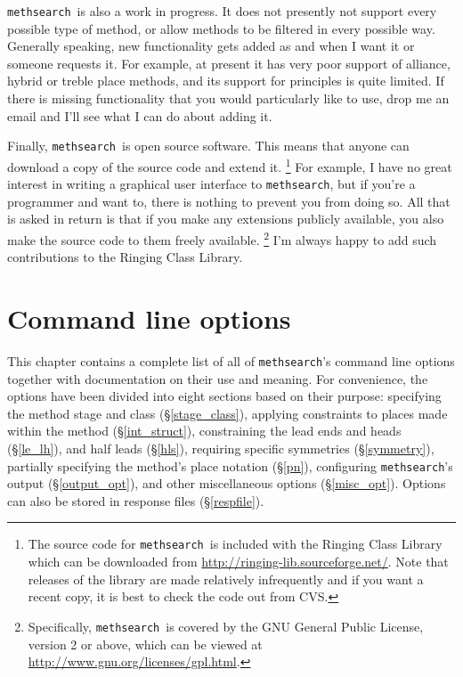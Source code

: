 \documentclass[a4paper,11pt,oneside]{book}
\def\methsearch{\texttt{meth\-search}}
\newcommand{\sref}[1]{\hyperref[#1]{\S\ref{#1}}}
\begin{document}
\methsearch\ is also a work in progress.  
It does not presently not support every possible type of method, 
or allow methods to be filtered in every possible way.
Generally speaking, new functionality gets added as and when I want it
or someone requests it.  For example, at present it has very poor support 
of alliance, hybrid or treble place methods,%
and its support for principles
is quite limited.
If there is missing functionality that you would particularly like to use, 
drop me an email and I'll see what I can do about adding it.

Finally, \methsearch\ is open source software.
This means that anyone 
can download a copy of the source code and extend it.%
\footnote{The source code for \methsearch\ is included with the 
Ringing Class Library which can be downloaded from 
\url{http://ringing-lib.sourceforge.net/}.  Note
that releases of the library are made relatively infrequently and if you
want a recent copy, it is best to check the code out from CVS.}
For example, I have no great interest in writing a graphical user interface 
to \methsearch, but if you're a programmer and want to, there is nothing to
prevent you from doing so.  All that is asked in return is that if you
make any extensions publicly available, you also make the source code to them
freely available.%
\footnote{Specifically, \methsearch\ is covered by the GNU General Public 
License, version 2 or above, which can be viewed at
\url{http://www.gnu.org/licenses/gpl.html}.}
I'm always happy to add such contributions to the Ringing Class Library.

\chapter{Command line options}

This chapter contains a complete list of all of \methsearch's command
line options together with documentation on their use and meaning.
For convenience, the options have been divided into eight sections based
on their purpose: specifying the method stage and class (\sref{stage_class}),
applying constraints to places made within the method (\sref{int_struct}),
constraining the lead ends and heads (\sref{le_lh}), and half leads 
(\sref{hls}), requiring specific symmetries (\sref{symmetry}),
partially specifying the method's place notation (\sref{pn}),
configuring \methsearch's output (\sref{output_opt}), and other 
miscellaneous options (\sref{misc_opt}).  Options can also be 
stored in response files (\sref{respfile}).
\end{document}

